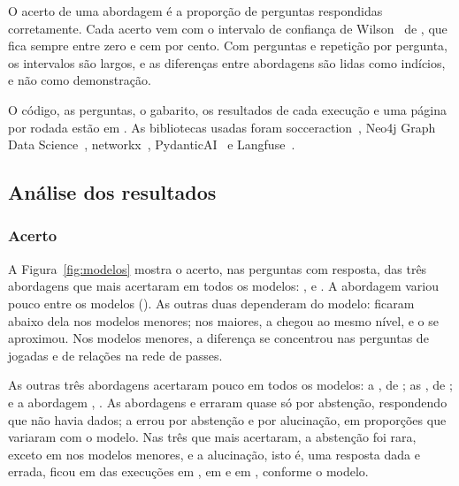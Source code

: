O acerto de uma abordagem é a proporção de perguntas respondidas corretamente. Cada acerto vem com o intervalo de
confiança de Wilson~\cite{wilson1927probable} de \ciLevel{}, que fica sempre entre zero e cem por cento. Com
\nAnswerable{} perguntas e \nRepeats{} repetição por pergunta, os intervalos são largos, e as diferenças entre
abordagens são lidas como indícios, e não como demonstração.

O código, as perguntas, o gabarito, os resultados de cada execução e uma página por rodada estão em
\repoURL{}. As bibliotecas usadas foram socceraction~\cite{socceraction}, Neo4j Graph Data
Science~\cite{neo4j_gds}, networkx~\cite{networkx}, PydanticAI~\cite{pydanticai} e Langfuse~\cite{langfuse}.

\subsection{Análise dos resultados}

\subsubsection{Acerto}

A Figura~\ref{fig:modelos} mostra o acerto, nas \nAnswerable{} perguntas com resposta, das três abordagens que mais
acertaram em todos os modelos: \armEventsInPrompt{}, \armTextToCypher{} e \armGraphTools{}. A abordagem
\armGraphTools{} variou pouco entre os modelos (\accRangeGraphTools{}). As outras duas dependeram do modelo:
ficaram abaixo dela nos modelos menores; nos maiores, a \armTextToCypher{} chegou ao mesmo nível, e o
\armEventsInPrompt{} se aproximou. Nos modelos menores, a diferença se concentrou nas perguntas de jogadas e de
relações na rede de passes.

As outras três abordagens acertaram pouco em todos os modelos: a \armVector{}, de \accRangeVector{}; as
\armStatsInPrompt{}, de \accRangeStatsInPrompt{}; e a abordagem \armNoContext{}, \accRangeNoContext{}. As
abordagens \armNoContext{} e \armStatsInPrompt{} erraram quase só por abstenção, respondendo que não havia dados; a
\armVector{} errou por abstenção e por alucinação, em proporções que variaram com o modelo. Nas três que mais
acertaram, a abstenção foi rara, exceto em \armEventsInPrompt{} nos modelos menores, e a alucinação, isto é, uma
resposta dada e errada, ficou em \hallRangeGraphTools{} das execuções em \armGraphTools{}, \hallRangeTextToCypher{}
em \armTextToCypher{} e \hallRangeEventsInPrompt{} em \armEventsInPrompt{}, conforme o modelo.

